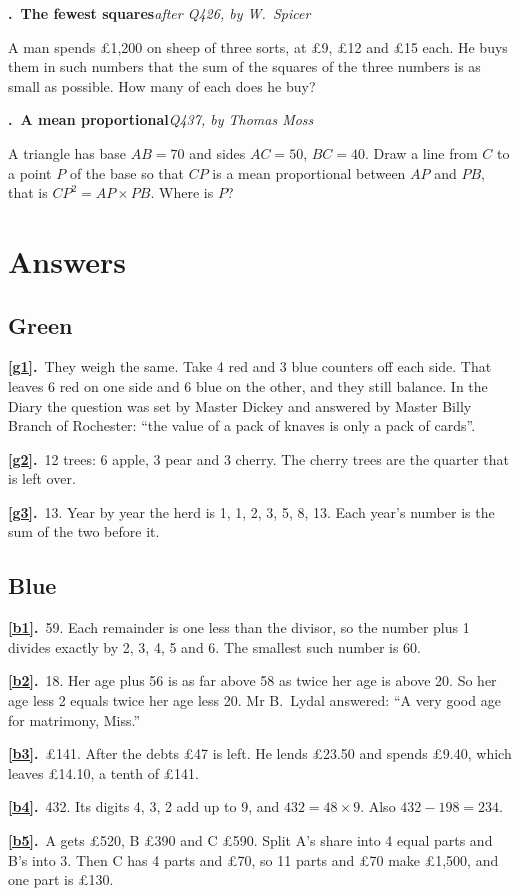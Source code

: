 \documentclass[11pt,a4paper]{article}
\newcounter{prob}
\newcommand{\prob}[3]{\par\bigskip\refstepcounter{prob}\label{#1}%
  \noindent\textbf{\theprob.\ #2}\hfill{\small\textit{#3}}\par\nopagebreak\smallskip}
\newcommand{\ans}[2]{\par\smallskip\noindent\textbf{\ref{#1}.}\ #2}
\begin{document}
\prob{u-sheep}{The fewest squares}{after Q426, by W.~Spicer}
A man spends \pounds1,200 on sheep of three sorts, at \pounds9, \pounds12 and \pounds15 each. He buys them in
such numbers that the sum of the squares of the three numbers is as small as possible.
How many of each does he buy?

\prob{u-mean}{A mean proportional}{Q437, by Thomas Moss}
A triangle has base $AB = 70$ and sides $AC = 50$, $BC = 40$. Draw a line from $C$ to a
point $P$ of the base so that $CP$ is a mean proportional between $AP$ and $PB$, that is
$CP^2 = AP\times PB$. Where is $P$?

\clearpage
\section*{Answers}

\subsection*{\color{bandgreen}Green}
\ans{g1}{They weigh the same. Take 4 red and 3 blue counters off each side. That leaves
6 red on one side and 6 blue on the other, and they still balance. In the Diary the
question was set by Master Dickey and answered by Master Billy Branch of Rochester:
``the value of a pack of knaves is only a pack of cards''.}
\ans{g2}{12 trees: 6 apple, 3 pear and 3 cherry. The cherry trees are the quarter that
is left over.}
\ans{g3}{13. Year by year the herd is 1, 1, 2, 3, 5, 8, 13. Each year's number is the
sum of the two before it.}

\subsection*{\color{bandblue}Blue}
\ans{b1}{59. Each remainder is one less than the divisor, so the number plus 1 divides
exactly by 2, 3, 4, 5 and 6. The smallest such number is 60.}
\ans{b2}{18. Her age plus 56 is as far above 58 as twice her age is above 20. So her
age less 2 equals twice her age less 20. Mr B.~Lydal answered: ``A very good age for
matrimony, Miss.''}
\ans{b3}{\pounds141. After the debts \pounds47 is left. He lends \pounds23.50 and spends \pounds9.40, which
leaves \pounds14.10, a tenth of \pounds141.}
\ans{b4}{432. Its digits 4, 3, 2 add up to 9, and $432 = 48\times9$. Also
$432 - 198 = 234$.}
\ans{b5}{A gets \pounds520, B \pounds390 and C \pounds590. Split A's share into 4 equal parts and B's
into 3. Then C has 4 parts and \pounds70, so 11 parts and \pounds70 make \pounds1,500, and one part is
\pounds130.}
\end{document}
